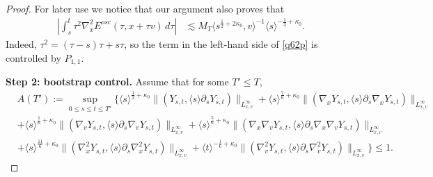 \documentclass[reqno,11pt]{amsart}
\numberwithin{equation}{section}
\begin{document}
\begin{proof}
	For later use we notice that our argument also proves that
	\begin{align}
		\left|\int_s^t\tau^2\nabla_x^2E^{osc}(\tau,x+\tau v)\,d\tau\right|
		&\lesssim M_T\langle s^{\frac12+2\kappa_0},v\rangle^{-1}\langle s\rangle^{-\frac13+\kappa_0}.
		\label{q62p}
	\end{align}
	Indeed, $\tau^2=(\tau-s)\tau+s\tau$, so the term in the left-hand side of \eqref{q62p} is controlled by $P_{1,1}$.
	\medskip
	
	\textbf{Step 2: bootstrap control.}
	Assume that for some $T'\le T$,
	\begin{equation}\label{n12}
		\begin{split}
			&A(T'):=	\sup_{0\leq s\leq t\leq T'}\big\{\langle s\rangle^{\frac{1}{2}+\kappa_0}\|(Y_{s,t},\langle s\rangle\partial_sY_{s,t})\|_{L^\infty_{x,v}}+\langle s\rangle^{\frac{7}{6}+\kappa_0}\|(\nabla_xY_{s,t},\langle s\rangle\partial_s\nabla_xY_{s,t})\|_{L^\infty_{x,v}}\\
			&+\langle s\rangle^{\frac{1}{6}+\kappa_0}\|(\nabla_vY_{s,t},\langle s\rangle\partial_s\nabla_vY_{s,t})\|_{L^\infty_{x,v}}	+\langle s\rangle^{\frac{5}{6}+\kappa_0}\|(\nabla_x\nabla_vY_{s,t},\langle s\rangle\partial_s\nabla_x\nabla_vY_{s,t})\|_{L^\infty_{x,v}}\\
			&+\langle s\rangle^{\frac{11}{6}+\kappa_0}\|(\nabla_x^2Y_{s,t},\langle s\rangle\partial_s\nabla_x^2Y_{s,t})\|_{L^\infty_{x,v}}+\langle t\rangle^{-\frac{1}{6}+\kappa_0}\|(\nabla_v^2Y_{s,t},\langle s\rangle\partial_s\nabla_v^2Y_{s,t})\|_{L^\infty_{x,v}}\big\}\leq 1.
		\end{split}
	\end{equation}
	

\end{proof}
\end{document}
